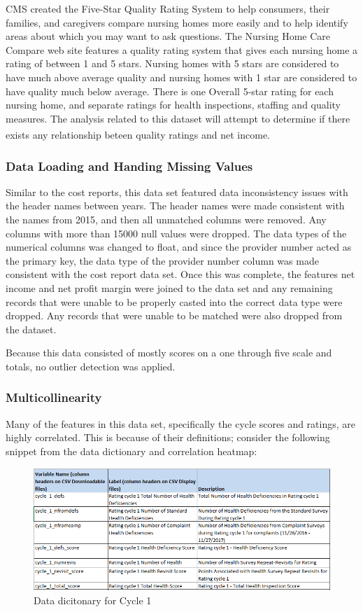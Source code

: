 \documentclass{article}
\theoremstyle{mytheoremstyle}
\theoremstyle{mytheoremstyle}
\theoremstyle{myproblemstyle}
\begin{document}
CMS created the Five-Star Quality Rating System to help consumers, their families, and caregivers compare nursing homes more easily and to help identify areas about which you may want to ask questions.  The Nursing Home Care Compare web site features a quality rating system that gives each nursing home a rating of between 1 and 5 stars.  Nursing homes with 5 stars are considered to have much above average quality and nursing homes with 1 star are considered to have quality much below average.  There is one Overall 5-star rating for each nursing home, and separate ratings for health inspections, staffing and quality measures. The analysis related to this dataset will attempt to determine if there exists any relationship beteen quality ratings and net income.\textsuperscript{\cite{cmsfive2023}}

\subsubsection{Data Loading and Handing Missing Values}
Similar to the cost reports, this data set featured data inconsistency issues with the header names between years. The header names were made consistent with the names from 2015, and then all unmatched columns were removed. Any columns with more than 15000 null values were dropped. The data types of the numerical columns was changed to float, and since the provider number acted as the primary key, the data type of the provider number column was made consistent with the cost report data set. Once this was complete, the features net income and net profit margin were joined to the data set and any remaining records that were unable to be properly casted into the correct data type were dropped. Any records that were unable to be matched were also dropped from the dataset.

Because this data consisted of mostly scores on a one through five scale and totals, no outlier detection was applied. 

\subsubsection{Multicollinearity}
Many of the features in this data set, specifically the cycle scores and ratings, are highly correlated. This is because of their definitions; consider the following snippet from the data dictionary and correlation heatmap:

\begin{figure}[htbp]
\centering
\includegraphics[width=0.8\linewidth]{Images/multicolin.png}
\caption{Data dicitonary for Cycle 1}
\label{fig:Multicolin Results}
\end{figure}
\end{document}
